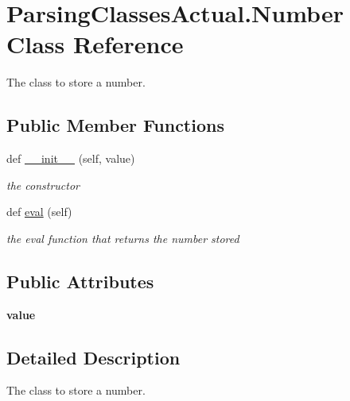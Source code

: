 \hypertarget{class_parsing_classes_actual_1_1_number}{}\section{Parsing\+Classes\+Actual.\+Number Class Reference}
\label{class_parsing_classes_actual_1_1_number}


The class to store a number.  


\subsection*{Public Member Functions}
\begin{DoxyCompactItemize}
\item 
def \hyperlink{class_parsing_classes_actual_1_1_number_afed3ef381388f6d2db19fec207e2bbf5}{\+\_\+\+\_\+init\+\_\+\+\_\+} (self, value)
\begin{DoxyCompactList}\small\item\em the constructor \end{DoxyCompactList}\item 
\mbox{\label{class_parsing_classes_actual_1_1_number_a77c608400a103e348084417e5a2782ef}} 
def \hyperlink{class_parsing_classes_actual_1_1_number_a77c608400a103e348084417e5a2782ef}{eval} (self)
\begin{DoxyCompactList}\small\item\em the eval function that returns the number stored \end{DoxyCompactList}\end{DoxyCompactItemize}
\subsection*{Public Attributes}
\begin{DoxyCompactItemize}
\item 
\mbox{\label{class_parsing_classes_actual_1_1_number_a88d148e6057e4ed5014e20876a7e8496}} 
{\bfseries value}
\end{DoxyCompactItemize}


\subsection{Detailed Description}
The class to store a number. 

